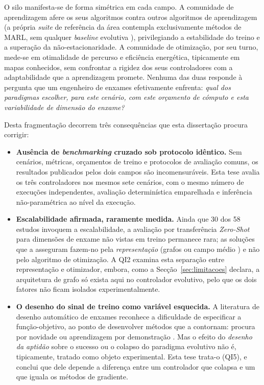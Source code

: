 \documentclass[12pt,reqno, twoside]{amsbook}
\theoremstyle{plain}
\numberwithin{equation}{chapter}
\numberwithin{section}{chapter}
\numberwithin{table}{chapter}
\numberwithin{figure}{chapter}
\begin{document}
O silo manifesta-se de forma simétrica em cada campo. A comunidade de aprendizagem afere os seus algoritmos contra outros algoritmos de aprendizagem (a própria \textit{suite} de referência da área contempla exclusivamente métodos de MARL, sem qualquer \textit{baseline} evolutiva \cite{bettini2024benchmarl}), privilegiando a estabilidade do treino e a superação da não-estacionaridade. A comunidade de otimização, por seu turno, mede-se em otimalidade de percurso e eficiência energética, tipicamente em mapas conhecidos, sem confrontar a rigidez dos seus controladores com a adaptabilidade que a aprendizagem promete. Nenhuma das duas responde à pergunta que um engenheiro de enxames efetivamente enfrenta: \emph{qual dos paradigmas escolher, para este cenário, com este orçamento de cómputo e esta variabilidade de dimensão do enxame?}

Desta fragmentação decorrem três consequências que esta dissertação procura corrigir:

\begin{itemize}
    \item \textbf{Ausência de \textit{benchmarking} cruzado sob protocolo idêntico.} Sem cenários, métricas, orçamentos de treino e protocolos de avaliação comuns, os resultados publicados pelos dois campos são incomensuráveis. Esta tese avalia os três controladores nos mesmos sete cenários, com o mesmo número de execuções independentes, avaliação determinística emparelhada e inferência não-paramétrica ao nível da execução.
    \item \textbf{Escalabilidade afirmada, raramente medida.} Ainda que 30 dos 58 estudos invoquem a escalabilidade, a avaliação por transferência \textit{Zero-Shot} para dimensões de enxame não vistas em treino permanece rara; as soluções que a asseguram fazem-no pela \emph{representação} (grafos \cite{zhang2022h2gnn, chen2024graph} ou campo médio \cite{tang2023meanfield}) e não pelo algoritmo de otimização. A QI2 examina esta separação entre representação e otimizador, embora, como a Secção~\ref{sec:limitacoes} declara, a arquitetura de grafo só exista aqui no controlador evolutivo, pelo que os dois fatores não ficam isolados experimentalmente.
    \item \textbf{O desenho do sinal de treino como variável esquecida.} A literatura de desenho automático de enxames reconhece a dificuldade de especificar a função-objetivo, ao ponto de desenvolver métodos que a contornam: procura por novidade \cite{hasselmann2023novelty} ou aprendizagem por demonstração \cite{szpirer2024composite}. Mas o efeito do \emph{desenho da aptidão} sobre o sucesso ou o colapso do paradigma evolutivo não é, tipicamente, tratado como objeto experimental. Esta tese trata-o (QI5), e conclui que dele depende a diferença entre um controlador que colapsa e um que iguala os métodos de gradiente.
\end{itemize}
\end{document}
